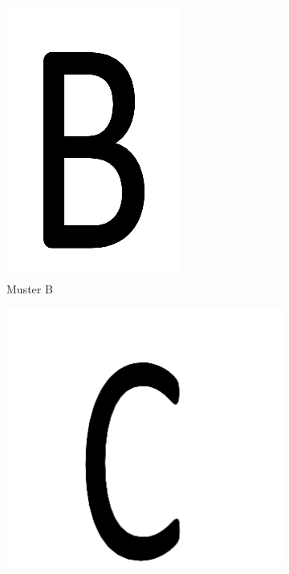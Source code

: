 \begin{figure}[H]
\begin{subfigure}{0.2\textwidth}
\includegraphics[width=0.95\linewidth]{assets/informatik-prototyp/opencv/target_node_detection/b.png} 
\caption{Muster B}
\label{fig:image-b}
\end{subfigure}
\begin{subfigure}{0.33\textwidth}
\includegraphics[width=0.95\linewidth]{assets/informatik-prototyp/opencv/target_node_detection/c.png} 

\end{subfigure}
\end{figure}
